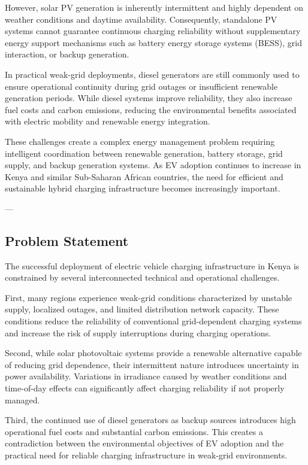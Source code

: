 However, solar PV generation is inherently intermittent and highly dependent on weather conditions and daytime availability. Consequently, standalone PV systems cannot guarantee continuous charging reliability without supplementary energy support mechanisms such as battery energy storage systems (BESS), grid interaction, or backup generation.

In practical weak-grid deployments, diesel generators are still commonly used to ensure operational continuity during grid outages or insufficient renewable generation periods. While diesel systems improve reliability, they also increase fuel costs and carbon emissions, reducing the environmental benefits associated with electric mobility and renewable energy integration.

These challenges create a complex energy management problem requiring intelligent coordination between renewable generation, battery storage, grid supply, and backup generation systems. As EV adoption continues to increase in Kenya and similar Sub-Saharan African countries, the need for efficient and sustainable hybrid charging infrastructure becomes increasingly important.

---

\subsection{Problem Statement}

The successful deployment of electric vehicle charging infrastructure in Kenya is constrained by several interconnected technical and operational challenges.

First, many regions experience weak-grid conditions characterized by unstable supply, localized outages, and limited distribution network capacity. These conditions reduce the reliability of conventional grid-dependent charging systems and increase the risk of supply interruptions during charging operations.

Second, while solar photovoltaic systems provide a renewable alternative capable of reducing grid dependence, their intermittent nature introduces uncertainty in power availability. Variations in irradiance caused by weather conditions and time-of-day effects can significantly affect charging reliability if not properly managed.

Third, the continued use of diesel generators as backup sources introduces high operational fuel costs and substantial carbon emissions. This creates a contradiction between the environmental objectives of EV adoption and the practical need for reliable charging infrastructure in weak-grid environments.

